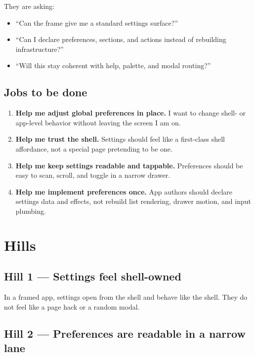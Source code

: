 They are asking:

\begin{itemize}
\tightlist
\item
  ``Can the frame give me a standard settings surface?''
\item
  ``Can I declare preferences, sections, and actions instead of rebuilding infrastructure?''
\item
  ``Will this stay coherent with help, palette, and modal routing?''
\end{itemize}

\subsection{Jobs to be done}\label{record-057-jobs-to-be-done}

\begin{enumerate}
\def\labelenumi{\arabic{enumi}.}
\item
  \textbf{Help me adjust global preferences in place.} I want to change shell- or app-level behavior without leaving the screen I am on.
\item
  \textbf{Help me trust the shell.} Settings should feel like a first-class shell affordance, not a special page pretending to be one.
\item
  \textbf{Help me keep settings readable and tappable.} Preferences should be easy to scan, scroll, and toggle in a narrow drawer.
\item
  \textbf{Help me implement preferences once.} App authors should declare settings data and effects, not rebuild list rendering, drawer motion, and input plumbing.
\end{enumerate}

\section{Hills}\label{record-057-hills}

\subsection{Hill 1 --- Settings feel shell-owned}\label{record-057-hill-1-settings-feel-shell-owned}

In a framed app, settings open from the shell and behave like the shell. They do not feel like a page hack or a random modal.

\subsection{Hill 2 --- Preferences are readable in a narrow lane}\label{record-057-hill-2-preferences-are-readable-in-a-narrow-lane}

